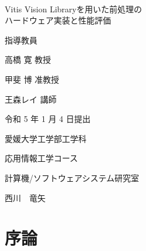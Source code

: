 \documentclass[11pt,a4j]{jreport}
\begin{document}
\thispagestyle{empty}
\begin{center}
\
\vspace{3cm}

{\huge{Vitis Vision Libraryを用いた前処理の\\
ハードウェア実装と性能評価}}

\vspace{9mm}

{\LARGE 指導教員}

\vspace{5mm}

{\LARGE 高橋 寛 教授}

\vspace{4mm}

{\LARGE 甲斐 博 准教授}

\vspace{4mm}

{\LARGE 王森レイ 講師}

\vspace{20mm}

{\LARGE 令和 5 年 1 月 4 日提出}\\

\vspace{20mm}

{\LARGE 愛媛大学工学部工学科}\\

\vspace{4mm}

{\LARGE 応用情報工学コース}\\

\vspace{4mm}

{\LARGE 計算機/ソフトウェアシステム研究室}\\

\vspace{18mm}

{\huge 西川　竜矢}\\

\end{center}

\thispagestyle{empty}
\clearpage

\tableofcontents

\pagestyle{fancy}
\lhead{\rightmark}
\renewcommand{\chaptermark}[1]{\markboth{第\ \normalfont\thechapter\ 章~~#1}{}}

\chapter{序論} %
\end{document}
